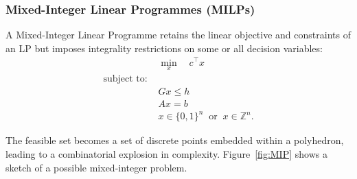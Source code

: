 \subsubsection{Mixed-Integer Linear Programmes (MILPs)}

A Mixed-Integer Linear Programme retains the linear objective and constraints of an LP but imposes integrality restrictions on some or all decision variables:
\begin{align*}
	&\min_{x} \quad c^{\top} x \\
	 \text{subject to: } & \\
	&Gx \le h \\
	&Ax = b \\
	&x \in \{0,1\}^n \;\; \text{or} \;\; x \in \mathbb{Z}^n .
\end{align*}

The feasible set becomes a set of discrete points embedded within a polyhedron, leading to a combinatorial explosion in complexity. Figure~\ref{fig:MIP} shows a sketch of a possible mixed-integer problem. 

